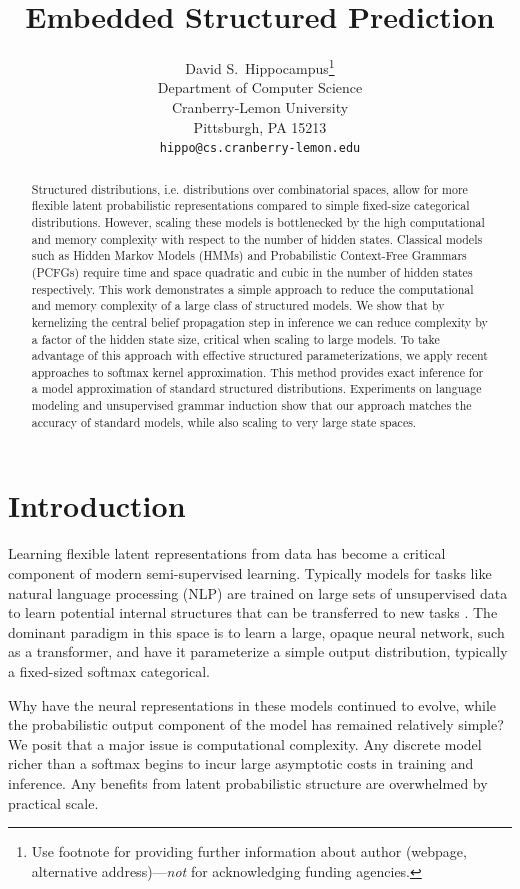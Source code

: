 \documentclass{article}
\title{Embedded Structured Prediction}
\author{%
  David S.~Hippocampus\thanks{Use footnote for providing further information
    about author (webpage, alternative address)---\emph{not} for acknowledging
    funding agencies.} \\
  Department of Computer Science\\
  Cranberry-Lemon University\\
  Pittsburgh, PA 15213 \\
  \texttt{hippo@cs.cranberry-lemon.edu} \\
}
\begin{document}
\maketitle

\begin{abstract}
  Structured distributions, i.e. distributions over combinatorial
  spaces, allow for more flexible latent probabilistic representations
  compared to simple fixed-size categorical distributions. However,
  scaling these models is bottlenecked by the high computational and
  memory complexity with respect to the number of hidden states.  Classical models
  such as Hidden Markov Models (HMMs) and Probabilistic Context-Free
  Grammars (PCFGs) require time and space quadratic and cubic in the
  number of hidden states respectively.  This work demonstrates a
  simple approach to reduce the computational and memory complexity of
  a large class of structured models. We show that by kernelizing the
  central belief propagation step in inference we can reduce
  complexity by a factor of the hidden state size, critical when scaling to
  large models. To take advantage of this approach with effective
  structured parameterizations, we apply recent approaches to softmax
  kernel approximation. This method provides exact inference for a
  model approximation of standard structured distributions.
  Experiments on language modeling and unsupervised grammar induction
  show that our approach matches the accuracy of standard models, 
  while also scaling to very large state spaces.
\end{abstract}


\section{Introduction}


Learning flexible latent representations from data has become a
critical component of modern semi-supervised learning. Typically
models for tasks like natural language processing (NLP) are trained on
large sets of unsupervised data to learn potential internal structures
that can be transferred to new tasks \citep{devlin2018bert,radford2019language,liu2019roberta}.
The dominant paradigm in this
space is to learn a large, opaque neural network, such as a
transformer, and have it parameterize a simple output distribution,
typically a fixed-sized softmax categorical.

Why have the neural representations in these models continued to evolve,
while the probabilistic output component of the model has remained relatively
simple? We posit that a major issue is computational complexity.  Any
discrete model richer than a softmax begins to incur large asymptotic
costs in training and inference. Any benefits from latent probabilistic
structure are overwhelmed by practical scale.
\end{document}
